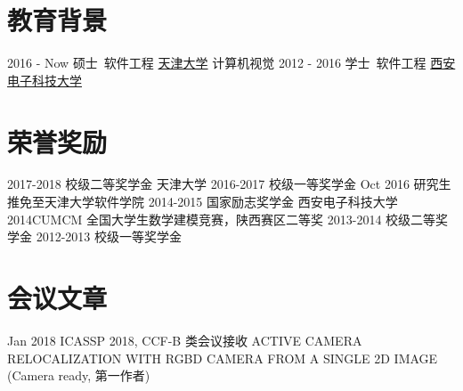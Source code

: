 \documentclass[utf8]{twentysecondcv} %
\begin{document}
\makeprofile %

\section{教育背景}

\begin{twenty} %
    \twentyitem
        {2016 - Now}
        {硕士\ 软件工程}
        {\href{http://tju.edu.cn/}{天津大学}}
        {计算机视觉}
        {}
    \twentyitem
        {2012 - 2016}
        {学士\ 软件工程}
        {\href{http://www.xidian.edu.cn/}{西安电子科技大学}}
        {}
        {}
\end{twenty}



\section{荣誉奖励}

\begin{twenty}
    \twentyitem
        {2017-2018}
        {校级二等奖学金}
        {天津大学}
        {}
        {}
    \twentyitem
        {2016-2017}
        {校级一等奖学金}
        {}
        {}
        {}
    \twentyitem
        {Oct 2016}
        {研究生推免至天津大学软件学院}
        {}
        {}
        {}
    \twentyitem
        {2014-2015}
        {国家励志奖学金}
        {西安电子科技大学}
        {}
        {}
    \twentyitem
        {2014CUMCM}
        {全国大学生数学建模竞赛，陕西赛区二等奖}
        {}
        {}
        {}
    \twentyitem
        {2013-2014}  
        {校级二等奖学金}
        {}
        {}
        {}
    \twentyitem        
        {2012-2013}
        {校级一等奖学金}
        {}
        {}
        {}        
\end{twenty}

\section{会议文章}

\begin{twenty}
    \twentyitem
        {Jan 2018}
        {ICASSP 2018, CCF-B 类会议接收}
        {}
        {}
        {ACTIVE CAMERA RELOCALIZATION WITH RGBD CAMERA
FROM A SINGLE 2D IMAGE (Camera ready, 第一作者)}
\end{twenty}
\end{document}
